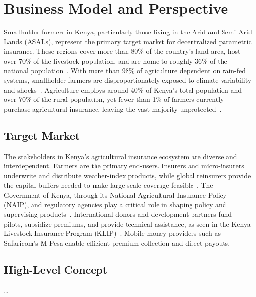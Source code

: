 \documentclass[11pt,a4paper]{article}
\begin{document}
    \section{Business Model and Perspective}\label{sec:business-model}
    Smallholder farmers in Kenya, particularly those living in the Arid and Semi-Arid Lands (ASALs), represent the primary target market for decentralized parametric insurance.
    These regions cover more than 80\% of the country’s land area, host over 70\% of the livestock population, and are home to roughly 36\% of the national population~\parencite{IUCN2021,UNEPDHI2021}.
    With more than 98\% of agriculture dependent on rain-fed systems, smallholder farmers are disproportionately exposed to climate variability and shocks~\parencite{GoK2017}.
    Agriculture employs around 40\% of Kenya’s total population and over 70\% of the rural population, yet fewer than 1\% of farmers currently purchase agricultural insurance, leaving the vast majority unprotected~\parencite{FAO2024b,MoA2023}.

    \subsection{Target Market}\label{subsec:target-market}
    The stakeholders in Kenya’s agricultural insurance ecosystem are diverse and interdependent.
    Farmers are the primary end-users.
    Insurers and micro-insurers underwrite and distribute weather-index products, while global reinsurers provide the capital buffers needed to make large-scale coverage feasible~\parencite{Artemis2017,BASIS2017}.
    The Government of Kenya, through its National Agricultural Insurance Policy (NAIP), and regulatory agencies play a critical role in shaping policy and supervising products~\parencite{AfricanClimate2024,MoA2023}.
    International donors and development partners fund pilots, subsidize premiums, and provide technical assistance, as seen in the Kenya Livestock Insurance Program (KLIP)~\parencite{WorldBank2022}.
    Mobile money providers such as Safaricom’s M-Pesa enable efficient premium collection and direct payouts\parencite{Oxford2017}.

    \subsection{High-Level Concept}\label{subsec:high-level-concept}
    \ldots
\end{document}

